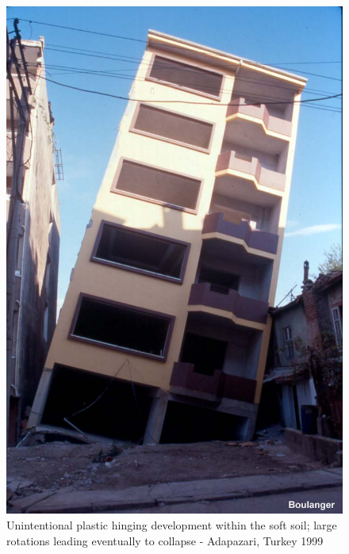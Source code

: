 \documentclass[12pt,a4paper]{report}
\begin{document}
\begin{figure}[!h]
\begin{minipage}[b]{0.4\textwidth}
		\includegraphics[width=\textwidth]{example3}
		\caption{Unintentional plastic hinging development within the soft soil; large rotations leading eventually to collapse - Adapazari, Turkey 1999}
		\label{turkey}
	\end{minipage}
\end{figure}
\end{document}
